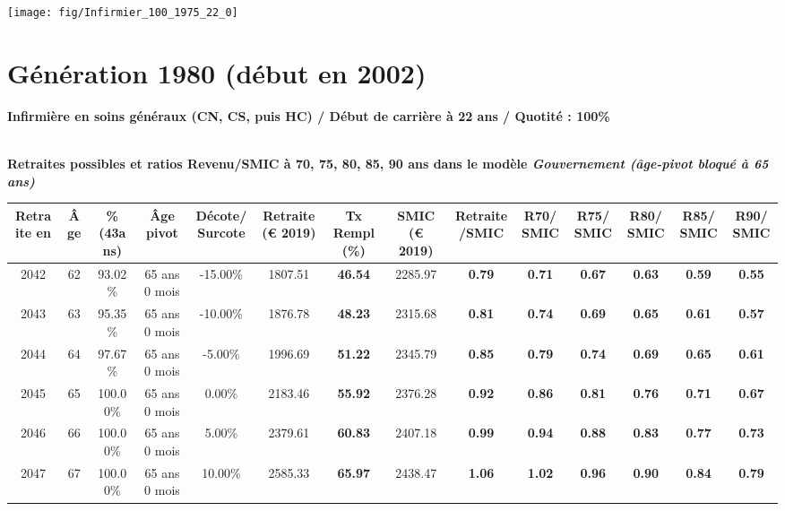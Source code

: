 {\hspace{-2.2cm}\texttt{[image: fig/Infirmier\_100\_1975\_22\_0]}} 

\newpage 
 
\section{Génération 1980 (début en 2002)\label{Infirmier_100_1980_22_0}} 
 
{\bf \noindent Infirmière en soins généraux (CN, CS, puis HC) / Début de carrière à 22 ans / Quotité : 100\%}  ~ 

 ~\\{\bf \noindent Retraites possibles et ratios Revenu/SMIC à 70, 75, 80, 85, 90 ans dans le modèle \emph{Gouvernement (âge-pivot bloqué à 65 ans)}}  
 
\begin{adjustbox}{max width=\textwidth} 
\begin{tabular}[htb]{|c|c||c|c|c||c|c||c|c||c|c|c|c|c|} 
\hline 
 Retraite en &  Âge &  \%(43ans) &  Âge pivot &  Décote/Surcote &  Retraite (\euro{} 2019) &  Tx Rempl(\%) &  SMIC (\euro{} 2019) &  Retraite/SMIC &  R70/SMIC &  R75/SMIC &  R80/SMIC &  R85/SMIC &  R90/SMIC \\ 
\hline \hline 
 2042 &  62 &  93.02\% &  65 ans 0 mois &  -15.00\% &  1807.51 &  {\bf 46.54} &  2285.97 &  {\bf {\color{red} 0.79}} &  {\bf {\color{red} 0.71}} &  {\bf {\color{red} 0.67}} &  {\bf {\color{red} 0.63}} &  {\bf {\color{red} 0.59}} &  {\bf {\color{red} 0.55}} \\ 
\hline 
 2043 &  63 &  95.35\% &  65 ans 0 mois &  -10.00\% &  1876.78 &  {\bf 48.23} &  2315.68 &  {\bf {\color{red} 0.81}} &  {\bf {\color{red} 0.74}} &  {\bf {\color{red} 0.69}} &  {\bf {\color{red} 0.65}} &  {\bf {\color{red} 0.61}} &  {\bf {\color{red} 0.57}} \\ 
\hline 
 2044 &  64 &  97.67\% &  65 ans 0 mois &  -5.00\% &  1996.69 &  {\bf 51.22} &  2345.79 &  {\bf {\color{red} 0.85}} &  {\bf {\color{red} 0.79}} &  {\bf {\color{red} 0.74}} &  {\bf {\color{red} 0.69}} &  {\bf {\color{red} 0.65}} &  {\bf {\color{red} 0.61}} \\ 
\hline 
 2045 &  65 &  100.00\% &  65 ans 0 mois &  0.00\% &  2183.46 &  {\bf 55.92} &  2376.28 &  {\bf {\color{red} 0.92}} &  {\bf {\color{red} 0.86}} &  {\bf {\color{red} 0.81}} &  {\bf {\color{red} 0.76}} &  {\bf {\color{red} 0.71}} &  {\bf {\color{red} 0.67}} \\ 
\hline 
 2046 &  66 &  100.00\% &  65 ans 0 mois &  5.00\% &  2379.61 &  {\bf 60.83} &  2407.18 &  {\bf {\color{red} 0.99}} &  {\bf {\color{red} 0.94}} &  {\bf {\color{red} 0.88}} &  {\bf {\color{red} 0.83}} &  {\bf {\color{red} 0.77}} &  {\bf {\color{red} 0.73}} \\ 
\hline 
 2047 &  67 &  100.00\% &  65 ans 0 mois &  10.00\% &  2585.33 &  {\bf 65.97} &  2438.47 &  {\bf 1.06} &  {\bf 1.02} &  {\bf {\color{red} 0.96}} &  {\bf {\color{red} 0.90}} &  {\bf {\color{red} 0.84}} &  {\bf {\color{red} 0.79}} \\ 
\hline 
\hline 
\end{tabular} 
\end{adjustbox} 
 
